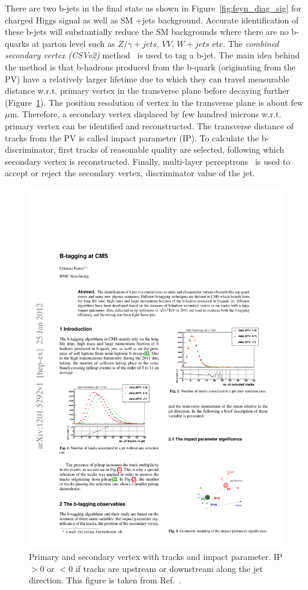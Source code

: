 There are two b-jets in the final state as shown in Figure~\ref{fig:feyn_diag_sig} for charged Higgs
signal as well as SM \ttbar+jets background.
Accurate identification of these b-jets will substantially reduce the SM backgrounds where there are no b-quarks at parton level such as $Z/\gamma + jets$, $VV$, $W + jets$ etc.
The {\em combined secondary vertex (CSVv2)} method~\cite{Chatrchyan:2012jua} is used to tag a b-jet.
The main idea behind the method is that b-hadrons produced from the b-quark (originating from the PV) 
have a relatively larger lifetime due to which they can travel measurable distance w.r.t. primary
vertex in the transverse plane before decaying further (Figure~\ref{fig:bCSV}). The position
resolution of vertex in the transverse plane is about few $\mu$m. Therefore, a secondary vertex displaced by few hundred microns w.r.t. primary vertex can be identified and reconstructed. 
The transverse distance of tracks from the PV is called impact parameter (IP).
To calculate the b-discriminator, first tracks of reasonable quality are selected, following which
secondary vertex is reconstructed. Finally, multi-layer perceptrons~\cite{CMS-PAS-BTV-15-001} is used
to accept or reject the secondary vertex, discriminator value of the jet.
\begin{figure}
\centering
\includegraphics[width=0.50\linewidth]{Image/bCSV.pdf}
\caption{ Primary and secondary vertex with tracks and impact parameter. IP $> 0$ or $< 0$ if tracks
are upstream or downstream along the jet direction. This figure is taken from Ref.~\cite{Ferro:2012tg}.} 
\label{fig:bCSV}
\end{figure}

